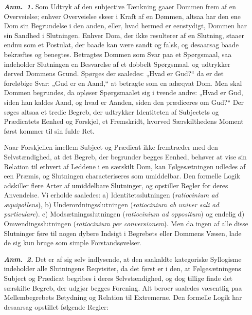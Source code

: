 \documentclass[12pt]{book}
\newcommand{\anm}[1]{\emph{\textbf{Anm.~#1.}}}
\newcommand{\opage}[1]{\marginnote{\footnotesize\textit{[#1]}}}
\begin{document}
\anm{1} Som Udtryk af den subjective Tænkning gaaer Dommen frem af en Overveielse;
enhver Overveielse skeer i Kraft af en Dømmen, altsaa har den ene Dom sin
Begrundelse i den anden, eller, hvad hermed er eenstydigt, Dommen har sin Sandhed i
Slutningen. Enhver Dom, der ikke resulterer af en Slutning, staaer endnu som et
Postulat, der baade kan være sandt og falsk, og desaarsag baade bekræftes og
benegtes. Betragtes Dommen som Svar paa et Spørgsmaal, saa indeholder Slutningen en
Besvarelse af et dobbelt Spørgsmaal, og udtrykker derved Dommens Grund. Spørges der
saaledes: „Hvad er Gud?“ da er det foreløbige Svar: „Gud er en Aand,“ at betragte
som en adæqvat Dom. Men skal Dommen begrundes, da opløser Spørgsmaalet sig i tvende
andre: „Hvad er Gud, siden han kaldes Aand, og hvad er Aanden, siden den prædiceres
om Gud?“ Der søges altsaa et tredie Begreb, der udtrykker Identiteten af Subjectets
og Prædicatets Eenhed og Forskjel, et Fremskridt, hvorved Særskilthedens Moment
først kommer til sin fulde Ret.

Naar Forskjellen imellem Subject og Prædicat ikke fremtræder med den
Selvstændighed, at det Begreb, der begrunder begges Eenhed, behøver at vise sin
Relation til ethvert af Leddene i en særskilt Dom, kan Følgesætningen udledes af een
Præmis, og Slutningen characteriseres som umiddelbar. Den formelle Logik adskiller
flere Arter af umiddelbare Slutninger, og opstiller Regler for deres Anvendelse. Vi
erholde saaledes: a) Identitetsslutningen (\textit{ratiocinium ad æquipollens}), b)
Underordningsslutningen (\textit{ratiocinium ab univer%
\opage{70}sali ad particulare}). c) Modsætningsslutningen (\textit{ratiocinium ad oppositum})
og endelig d) Omvendingsslutningen (\textit{ratiocinium per conversionem}). Men da
ingen af alle disse Slutninger føre til nogen dybere Indsigt i Begrebets eller
Dommens Væsen, lade de sig kun bruge som simple Forstandsøvelser.

\anm{2} Det er af sig selv indlysende, at den saakaldte kategoriske Syllogisme
indeholder alle Slutningens Reqvisiter, da det først er i den, at Følgesætningens
Subject og Prædicat begribes i deres Selvstændighed, og dog tillige finde det
særskilte Begreb, der udgjør begges Forening. Alt beroer saaledes væsentlig paa
Mellembegrebets Betydning og Relation til Extremerne. Den formelle Logik har
desaarsag opstillet følgende Regler:
\end{document}
